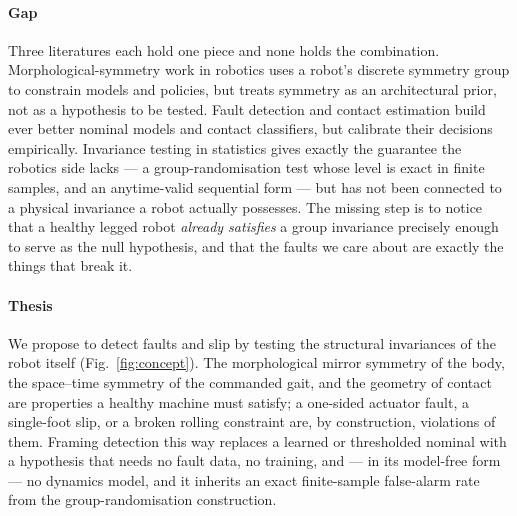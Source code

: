 \paragraph{Gap}
Three literatures each hold one piece and none holds the combination. Morphological-symmetry work in robotics
\cite{ordonez2023discrete} uses a robot's discrete symmetry group to constrain models and policies, but treats symmetry
as an architectural prior, not as a hypothesis to be tested. Fault detection and contact estimation
\cite{camurri2017probabilistic,lin2021contact} build ever better nominal models and contact classifiers, but calibrate
their decisions empirically. Invariance testing in statistics \cite{hemerik2018exact,koning2023evalues} gives exactly
the guarantee the robotics side lacks --- a group-randomisation test whose level is exact in finite samples, and an
anytime-valid sequential form --- but has not been connected to a physical invariance a robot actually possesses. The
missing step is to notice that a healthy legged robot \emph{already satisfies} a group invariance precisely enough to
serve as the null hypothesis, and that the faults we care about are exactly the things that break it.

\paragraph{Thesis}
We propose to detect faults and slip by testing the structural invariances of the robot itself (Fig.~\ref{fig:concept}).
The morphological mirror symmetry of the body, the space--time symmetry of the commanded gait, and the geometry of
contact are properties a healthy machine must satisfy; a one-sided actuator fault, a single-foot slip, or a broken
rolling constraint are, by construction, violations of them. Framing detection this way replaces a learned or
thresholded nominal with a hypothesis that needs no fault data, no training, and --- in its model-free form --- no
dynamics model, and it inherits an exact finite-sample false-alarm rate from the group-randomisation construction.

